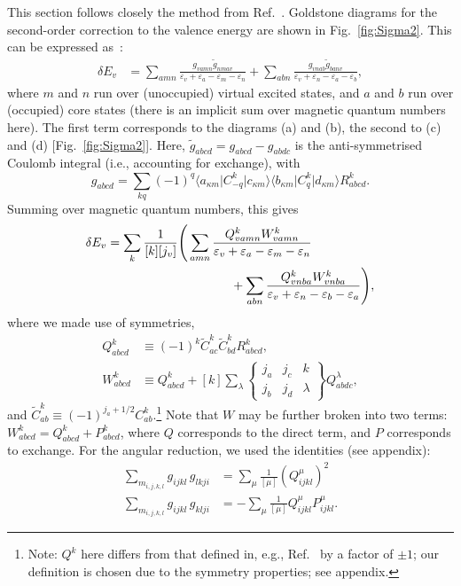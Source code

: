 \documentclass[10pt,twocolumn,a4paper]{article}%
\newcommand{\bra}[1]{\ensuremath{\langle #1|}}	%
\newcommand{\ket}[1]{\ensuremath{|#1\rangle}}	%
\newcommand{\sixj}[6]{\ensuremath{\begin{Bmatrix}#1&#2&#3\\#4&#5&#6\end{Bmatrix}}}	%
\newcommand{\be}{\begin{equation}}
\newcommand{\ee}{\end{equation}}
\def\en{\ensuremath{\varepsilon}}
\renewcommand{\k}{\ensuremath{\kappa}}
\begin{document}
This section follows closely the method from Ref.~\cite{DzubaHFS1984}.
Goldstone diagrams for the second-order correction to the valence energy are shown in Fig.~\ref{fig:Sigma2}.
This can be expressed as~\cite{DzubaHFS1984,JohnsonBook2007}:
\begin{align}\label{eq:dE-SO}
\delta E_v &= 
\sum_{amn}
\frac{g_{vamn}\widetilde g_{nmav}}{\en_v+\en_a - \en_m-\en_n}
+\sum_{abn}
 \frac{g_{vnab}\widetilde g_{banv}}{\en_v+\en_n-\en_a-\en_b}  ,
\end{align}
where $m$ and $n$ run over (unoccupied) virtual excited states, and $a$ and $b$ run over (occupied) core states (there is an implicit sum over magnetic quantum numbers here).
The first term corresponds to the diagrams (a) and (b), the second to (c) and (d) [Fig.~\ref{fig:Sigma2}].
Here,
$ \widetilde g_{abcd} =  g_{abcd} -  g_{abdc}$ 
is the anti-symmetrised Coulomb integral (i.e., accounting for exchange), with
\be
 g_{abcd} = \sum_{kq} (-1)^q \bra{a_{\k m}}C^k_{-q}\ket{c_{\k m}} \bra{b_{\k m}}C^k_{q}\ket{d_{\k m}} R^k_{abcd}.
\ee
Summing over magnetic quantum numbers, this gives~\cite{DzubaHFS1984}
\begin{align}
\delta E_v &=\sum_k \frac{1}{[k][j_v]}\Bigg(
 \sum_{amn} \frac{Q^k_{vamn}W^k_{vamn}}{\en_v+\en_a - \en_m-\en_n}
\notag\\&\qquad\qquad\qquad\qquad\qquad
+\sum_{abn}\frac{Q^k_{vnba}W^k_{vnba}}{\en_v+\en_n-\en_b-\en_a} 
 \Bigg),
\end{align}
where we made use of symmetries,  
\begin{align}
Q^k_{abcd} &\equiv (-1)^k \widetilde C^k_{ac}\widetilde C^k_{bd}R^k_{abcd}, \\
W^k_{abcd} &\equiv Q^k_{abcd} + [k] \sum_\lambda \sixj{j_a}{j_c}{k}{j_b}{j_d}{\lambda}Q^\lambda_{abdc} ,
\end{align}
and
$\widetilde C^k_{ab}\equiv  (-1)^{j_a+1/2}  C^k_{ab}$.\footnote{Note: $Q^k$ here differs from that defined in, e.g., Ref.~\cite{DzubaHFS1984} by a factor of $\pm1$; our definition is chosen due to the symmetry properties; see appendix.}
Note that $W$ may be further broken into two terms:
$W^k_{abcd} = Q^k_{abcd} + P^k_{abcd}$, where $Q$ corresponds to the direct term, and $P$ corresponds to exchange.
For the angular reduction, we used the identities (see appendix):
\begin{align}
\sum_{m_{i,j,k,l}}  g_{ijkl} \, g_{lkji}
    &= \sum_\mu \frac{1}{[\mu]} \left( Q^\mu_{ijkl}\right)^2 \\
\sum_{m_{i,j,k,l}}  g_{ijkl} \,g_{klji}
    &=-\sum_\mu \frac{1}{[\mu]}  Q^\mu_{ijkl}P^\mu_{ijkl}.
\end{align}
\end{document}
